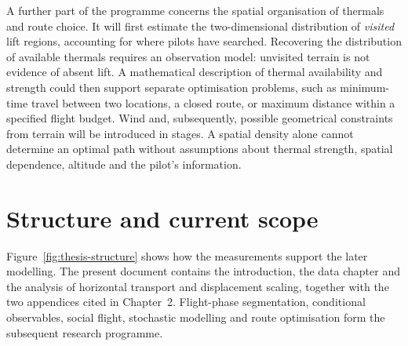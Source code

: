 A further part of the programme concerns the spatial organisation of thermals and route
choice. It will first estimate the two-dimensional distribution of \emph{visited} lift
regions, accounting for where pilots have searched. Recovering the distribution of
available thermals requires an observation model: unvisited terrain is not evidence of
absent lift. A mathematical description of thermal availability and strength could then
support separate optimisation problems, such as minimum-time travel between two locations,
a closed route, or maximum distance within a specified flight budget. Wind and, subsequently,
possible geometrical constraints from terrain will be introduced in stages. A spatial
density alone cannot determine an optimal path without assumptions about thermal strength,
spatial dependence, altitude and the pilot's information.

\section{Structure and current scope}

Figure~\ref{fig:thesis-structure} shows how the measurements support the later modelling.
The present document contains the introduction, the data chapter and the analysis of
horizontal transport and displacement scaling, together with the two appendices
cited in Chapter~2. Flight-phase segmentation, conditional observables, social flight,
stochastic modelling and route optimisation form the subsequent research programme.

